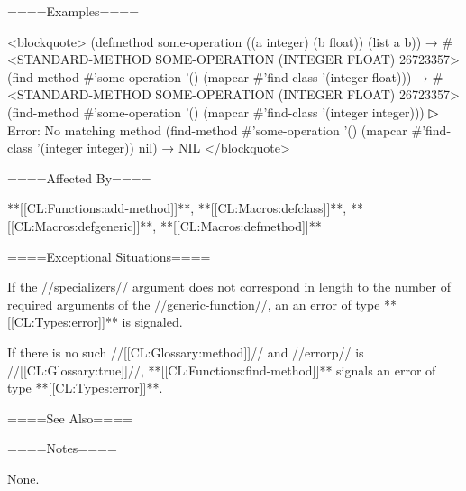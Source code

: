 ====Examples====

<blockquote> (defmethod some-operation ((a integer) (b float)) (list a b)) → #<STANDARD-METHOD SOME-OPERATION (INTEGER FLOAT) 26723357> (find-method #'some-operation '() (mapcar #'find-class '(integer float))) → #<STANDARD-METHOD SOME-OPERATION (INTEGER FLOAT) 26723357> (find-method #'some-operation '() (mapcar #'find-class '(integer integer)))
▷ Error: No matching method (find-method #'some-operation '() (mapcar #'find-class '(integer integer)) nil) → NIL </blockquote>

====Affected By====

**[[CL:Functions:add-method]]**, **[[CL:Macros:defclass]]**, **[[CL:Macros:defgeneric]]**, **[[CL:Macros:defmethod]]**

====Exceptional Situations====

If the //specializers// argument does not correspond in length to the number of required arguments of the //generic-function//, an an error of type **[[CL:Types:error]]** is signaled.

If there is no such //[[CL:Glossary:method]]// and //errorp// is //[[CL:Glossary:true]]//, **[[CL:Functions:find-method]]** signals an error of type **[[CL:Types:error]]**.

====See Also====

{\secref\SpecializerQualifierAgreement}

====Notes====

None.


